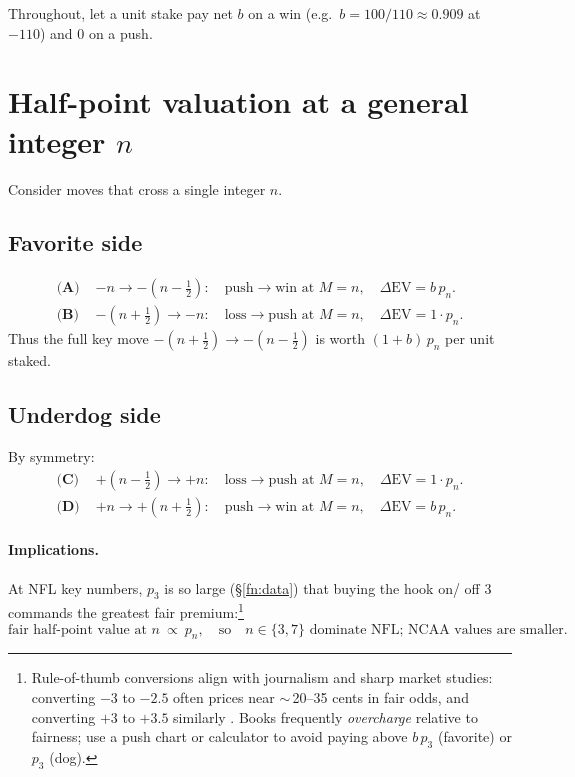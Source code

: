 \documentclass[11pt]{amsart}
\begin{document}
Throughout, let a unit stake pay net $b$ on a win (e.g.\ $b=100/110\approx0.909$ at $-110$) and $0$ on a push.

\section{Half-point valuation at a general integer $n$}
Consider moves that cross a single integer $n$.

\subsection*{Favorite side}
\begin{align*}
\textbf{(A) }&-n \to -(n-\tfrac12): \quad \text{push}\to\text{win at }M=n, \quad \Delta \mathrm{EV}=b\,p_n.\\
\textbf{(B) }&-(n+\tfrac12) \to -n: \quad \text{loss}\to\text{push at }M=n,\quad \Delta \mathrm{EV}=1\cdot p_n.
\end{align*}
Thus the full key move $-(n+\tfrac12)\to -(n-\tfrac12)$ is worth $(1+b)\,p_n$ per unit staked.

\subsection*{Underdog side}
By symmetry:
\begin{align*}
\textbf{(C) }&+(n-\tfrac12)\to +n:\quad \text{loss}\to\text{push at }M=n,\quad \Delta \mathrm{EV}=1\cdot p_n.\\
\textbf{(D) }&+n\to +(n+\tfrac12):\quad \text{push}\to\text{win at }M=n,\quad \Delta \mathrm{EV}=b\,p_n.
\end{align*}

\paragraph{Implications.}
At NFL key numbers, $p_3$ is so large (\S\ref{fn:data}) that buying the hook on/ off $3$ commands the greatest fair premium:\footnote{Rule-of-thumb conversions align with journalism and sharp market studies: converting $-3$ to $-2.5$ often prices near $\sim\,$20--35 cents in fair odds, and converting $+3$ to $+3.5$ similarly \cite{WaPo-Greenberg-Keys,Action-KeyNumbers-2024}. Books frequently \emph{overcharge} relative to fairness; use a push chart or calculator to avoid paying above $b\,p_3$ (favorite) or $p_3$ (dog).}
\[
\text{fair half-point value at $n$} \ \propto\ p_n,\quad \text{so}\quad n\in\{3,7\} \text{ dominate NFL; NCAA values are smaller}.
\]
\end{document}
